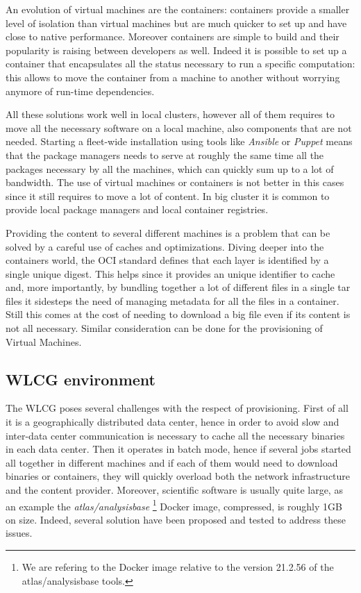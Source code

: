 An evolution of virtual machines are the containers: containers provide a
smaller level of isolation than virtual machines but are much quicker to set up
and have close to native performance. Moreover containers are simple to build
and their popularity is raising between developers as well. Indeed it is
possible to set up a container that encapsulates all the status necessary to
run a specific computation: this allows to move the container from a machine to
another without worrying anymore of run-time dependencies.

All these solutions work well in local clusters, however all of them requires
to move all the necessary software on a local machine, also components that are
not needed. Starting a fleet-wide installation using tools like
\textit{Ansible} or \textit{Puppet} means that the package managers needs to
serve at roughly the same time all the packages necessary by all the machines,
which can quickly sum up to a lot of bandwidth. The use of virtual machines or
containers is not better in this cases since it still requires to move a lot of
content. In big cluster it is common to provide local package managers and local
container registries.

Providing the content to several different machines is a problem that can be
solved by a careful use of caches and optimizations. Diving deeper into the
containers world, the OCI standard defines that each layer is identified by a
single unique digest. This helps since it provides an unique identifier to
cache and, more importantly, by bundling together a lot of different files in a
single tar files it sidesteps the need of managing metadata for all the files in
a container. Still this comes at the cost of needing to download a big file
even if its content is not all necessary. Similar consideration can be done for
the provisioning of Virtual Machines.

\subsection{WLCG environment} \label{subsec:soawlcg}

The WLCG poses several challenges with the respect of provisioning.  First of
all it is a geographically distributed data center, hence in order to avoid
slow and inter-data center communication is necessary to cache all the
necessary binaries in each data center.  Then it operates in batch mode, hence
if several jobs started all together in different machines and if each of them
would need to download binaries or containers, they will quickly overload both
the network infrastructure and the content provider.  Moreover, scientific
software is usually quite large, as an example the \textit{atlas/analysisbase}
\footnote{We are refering to the Docker image relative to the version 21.2.56
of the atlas/analysisbase tools.} Docker image, compressed, is roughly 1GB on
size.  Indeed, several solution have been proposed and tested to address these
issues.

